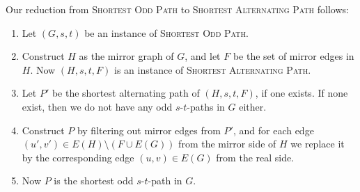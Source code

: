 Our reduction from \textsc{Shortest Odd Path} to \textsc{Shortest Alternating Path} follows:
\begin{enumerate}
    \item Let $(G, s, t)$ be an instance of \textsc{Shortest Odd Path}.
    \item Construct $H$ as the mirror graph of $G$, and let $F$ be the set of mirror edges in $H$. Now $(H, s, t, F)$ is an instance of \textsc{Shortest Alternating Path}.
    \item Let $P'$ be the shortest alternating path of $(H, s, t, F)$, if one exists. If none exist, then we do not have any odd $s$-$t$-paths in $G$ either.
    \item Construct $P$ by filtering out mirror edges from $P'$, and for each edge $(u',v') \in E(H) \setminus (F \cup E(G))$ from the mirror side of $H$ we replace it by the corresponding edge $(u,v) \in E(G)$ from the real side.
    \label{point:translate_alternating_path}
    \item Now $P$ is the shortest odd $s$-$t$-path in $G$.
\end{enumerate}

